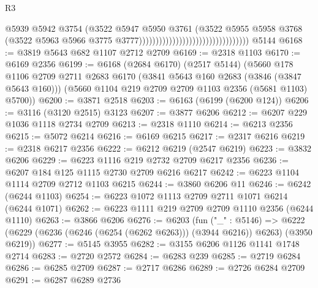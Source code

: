 \begin{lexlean}{R3}
\begin{coremodule}
                                                                @5939
                                                                @5942
                                                                @3754
                                                                (@3522
                                                                  @5947
                                                                  @5950
                                                                  @3761
                                                                  (@3522
                                                                    @5955
                                                                    @5958
                                                                    @3768
                                                                    (@3522
                                                                      @5963
                                                                      @5966
                                                                      @3775
                                                                      @3777)))))))))))))))))))))))))))))))))
    @5144
@6168 := @3819 @5643 @682 @1107 @2712 @2709
@6169 := @2318 @1103
@6170 := @6169 @2356
@6199 := @6168
    (@2684 @6170)
    (@2517 @5144)
    (@5660
      @178
      @1106
      @2709
      @2711
      @2683
      @6170
      (@3841 @5643 @160 @2683 (@3846 (@3847 @5643 @160)))
      (@5660 @1104 @219 @2709 @2709 @1103 @2356 (@5681 @1103) @5700))
@6200 := @3871 @2518
@6203 := @6163 (@6199 (@6200 @124))
@6206 := @3116 (@3120 @2515) @3123
@6207 := @3877 @6206
@6212 := @6207 @229 @1036 @1118 @2734 @2709
@6213 := @2318 @1110
@6214 := @6213 @2356
@6215 := @5072 @6214
@6216 := @6169 @6215
@6217 := @2317 @6216
@6219 := @2318 @6217 @2356
@6222 := @6212 @6219 (@2547 @6219)
@6223 := @3832 @6206
@6229 := @6223 @1116 @219 @2732 @2709 @6217 @2356
@6236 := @6207 @184 @125 @1115 @2730 @2709 @6216 @6217
@6242 := @6223 @1104 @1114 @2709 @2712 @1103 @6215
@6244 := @3860 @6206 @11
@6246 := @6242 (@6244 @1103)
@6254 := @6223 @1072 @1113 @2709 @2711 @1071 @6214 (@6244 @1071)
@6262 := @6223 @1111 @219 @2709 @2709 @1110 @2356 (@6244 @1110)
@6263 := @3866 @6206
@6276 := @6203
    (fun ("_" : @5146) =>
    @6222 (@6229 (@6236 (@6246 (@6254 (@6262 @6263))) (@3944 @6216)) @6263) (@3950 @6219))
@6277 := @5145 @3955
@6282 := @3155 @6206 @1126 @1141 @1748 @2714
@6283 := @2720 @2572
@6284 := @6283 @239
@6285 := @2719 @6284
@6286 := @6285 @2709
@6287 := @2717 @6286
@6289 := @2726 @6284 @2709
@6291 := @6287 @6289 @2736

\end{coremodule}
\end{lexlean}
